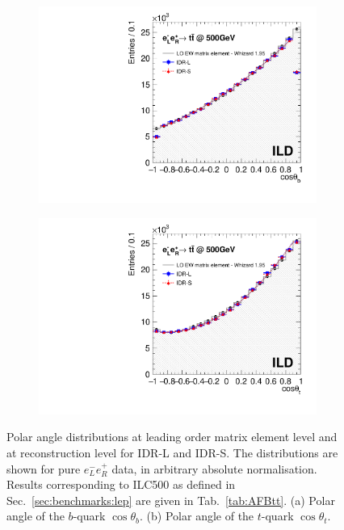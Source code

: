 \begin{figure}[htbp]
\begin{subfigure}{0.475\hsize} 
\includegraphics[width=\textwidth]{Performance/fig/compare_normalized_b.pdf}
 \caption{ \label{fig:ttbar:costhetab}}
 \end{subfigure}
\begin{subfigure}{0.475\hsize} 
\includegraphics[width=\textwidth]{Performance/fig/compare_normalized.pdf}
 \caption{  \label{fig:ttbar:costhetat}}
 \end{subfigure}
\caption{Polar angle distributions at leading order matrix element level and at reconstruction level for IDR-L and IDR-S. The distributions are shown for pure $e^-_L e^+_R$ data, in arbitrary absolute normalisation. Results corresponding to ILC500 as defined in  Sec.~\ref{sec:benchmarks:lep} are given in Tab.~\ref{tab:AFBtt}.
(a) Polar angle of the $b$-quark $\cos{\theta_b}$. 
(b) Polar angle of the $t$-quark $\cos{\theta_t}$.
}
\label{fig:ttbar:result}
\end{figure}


